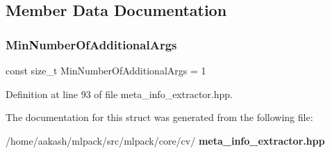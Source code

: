 \subsection{Member Data Documentation}
\mbox{\label{structmlpack_1_1cv_1_1TrainFormBase7_adacbdda6f41a542559105d6e48d1cfc2}} 
\subsubsection{Min\+Number\+Of\+Additional\+Args}
{\footnotesize\ttfamily const size\+\_\+t Min\+Number\+Of\+Additional\+Args = 1\hspace{0.3cm}{\ttfamily [static]}}



Definition at line 93 of file meta\+\_\+info\+\_\+extractor.\+hpp.



The documentation for this struct was generated from the following file\+:\begin{DoxyCompactItemize}
\item 
/home/aakash/mlpack/src/mlpack/core/cv/\textbf{ meta\+\_\+info\+\_\+extractor.\+hpp}\end{DoxyCompactItemize}
